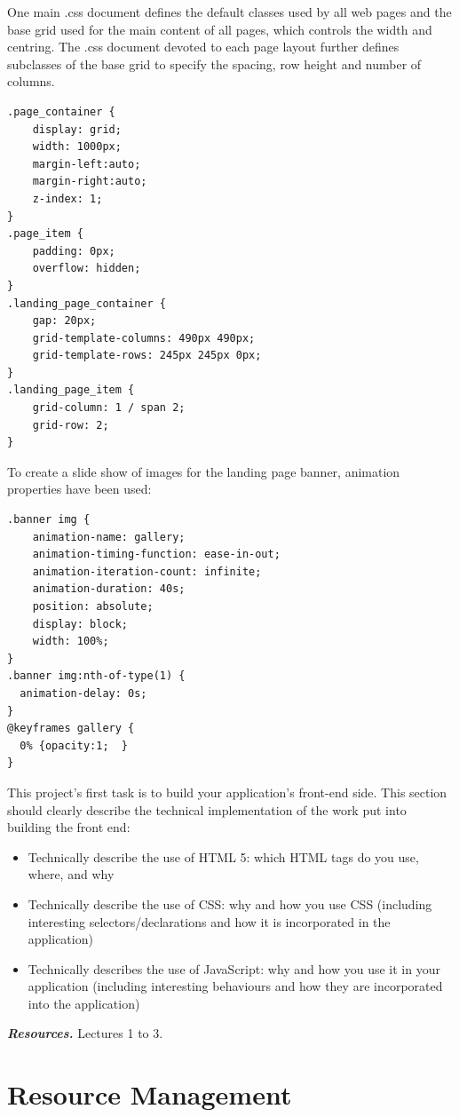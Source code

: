\documentclass[letterpaper,twocolumn]{article}
\newcommand{\myparagraph}[1]{\vspace{0.1cm}\noindent \textbf{\textit{#1.}}}
\begin{document}
One main .css document defines the default classes used by all web pages and the base grid used for the main content of all pages, which controls the width and centring. The .css document devoted to each page layout further defines subclasses of the base grid to specify the spacing, row height and number of columns. 

\begin{verbatim}
.page_container {
	display: grid;
	width: 1000px;
	margin-left:auto;
	margin-right:auto;
	z-index: 1;
}
.page_item {
	padding: 0px;
	overflow: hidden;
}
.landing_page_container {
	gap: 20px;
	grid-template-columns: 490px 490px;
	grid-template-rows: 245px 245px 0px;
}
.landing_page_item {
	grid-column: 1 / span 2;
	grid-row: 2;
}
\end{verbatim}
To create a slide show of images for the landing page banner, animation properties have been used:

\begin{verbatim}
.banner img {
	animation-name: gallery;
	animation-timing-function: ease-in-out;
	animation-iteration-count: infinite;
	animation-duration: 40s;
	position: absolute;
	display: block;
	width: 100%;
}
.banner img:nth-of-type(1) {
  animation-delay: 0s;
}
@keyframes gallery {
  0% {opacity:1;  }
}
\end{verbatim}

This project's first task is to build your application's front-end side.
This section should clearly describe the technical implementation of the work put into building the front end:

\begin{itemize}
    \item Technically describe the use of HTML 5: which HTML tags do you use, where, and why
    \item Technically describe the use of CSS: why and how you use CSS (including interesting selectors/declarations and how it is incorporated in the application)
    \item Technically describes the use of JavaScript: why and how you use it in your application (including interesting behaviours and how they are incorporated into the application)
\end{itemize}

\myparagraph{Resources} Lectures 1 to 3.

\section{Resource Management}
\end{document}
